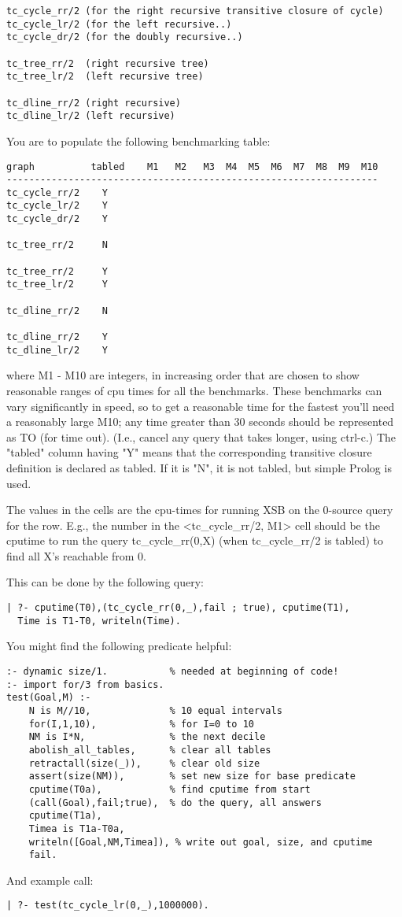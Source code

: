 \begin{enumerate}
\begin{verbatim}
tc_cycle_rr/2 (for the right recursive transitive closure of cycle)
tc_cycle_lr/2 (for the left recursive..)
tc_cycle_dr/2 (for the doubly recursive..)

tc_tree_rr/2  (right recursive tree)
tc_tree_lr/2  (left recursive tree)

tc_dline_rr/2 (right recursive)
tc_dline_lr/2 (left recursive)
\end{verbatim}

You are to populate the following benchmarking table:

\begin{verbatim}
graph          tabled    M1   M2   M3  M4  M5  M6  M7  M8  M9  M10
------------------------------------------------------------------
tc_cycle_rr/2    Y 
tc_cycle_lr/2    Y
tc_cycle_dr/2    Y

tc_tree_rr/2     N

tc_tree_rr/2     Y
tc_tree_lr/2     Y

tc_dline_rr/2    N

tc_dline_rr/2    Y
tc_dline_lr/2    Y
\end{verbatim}
where M1 - M10 are integers, in increasing order that are chosen
to show reasonable ranges of cpu times for all the benchmarks.  These
benchmarks can vary significantly in speed, so to get a reasonable
time for the fastest you'll need a reasonably large M10; any time
greater than 30 seconds should be represented as TO (for time out).
(I.e., cancel any query that takes longer, using ctrl-c.)  The
"tabled" column having "Y" means that the corresponding transitive
closure definition is declared as tabled.  If it is "N", it is not
tabled, but simple Prolog is used.

The values in the cells are the cpu-times for running XSB on the
0-source query for the row.  E.g., the number in the <tc\_cycle\_rr/2,
M1> cell should be the cputime to run the query tc\_cycle\_rr(0,X) (when
tc\_cycle\_rr/2 is tabled) to find all X's reachable from 0.

This can be done by the following query:
\begin{verbatim}
| ?- cputime(T0),(tc_cycle_rr(0,_),fail ; true), cputime(T1), 
  Time is T1-T0, writeln(Time).
\end{verbatim}

You might find the following predicate helpful:

\begin{verbatim}
:- dynamic size/1.           % needed at beginning of code!
:- import for/3 from basics.
test(Goal,M) :-
    N is M//10,              % 10 equal intervals
    for(I,1,10),             % for I=0 to 10
    NM is I*N,               % the next decile
    abolish_all_tables,      % clear all tables
    retractall(size(_)),     % clear old size
    assert(size(NM)),        % set new size for base predicate
    cputime(T0a),            % find cputime from start
    (call(Goal),fail;true),  % do the query, all answers
    cputime(T1a),
    Timea is T1a-T0a,
    writeln([Goal,NM,Timea]), % write out goal, size, and cputime
    fail.
\end{verbatim}

And example call:
\begin{verbatim}
| ?- test(tc_cycle_lr(0,_),1000000).
\end{verbatim}
\end{enumerate}
